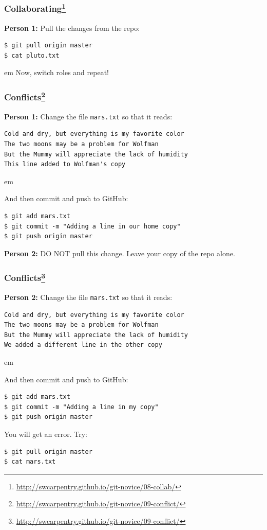 \documentclass{beamer}
\begin{document}
\begin{frame}[fragile]
\frametitle{Collaborating\footnote{\url{http://swcarpentry.github.io/git-novice/08-collab/}}}

\textbf{Person 1:} Pull the changes from the repo:
\begin{verbatim}
$ git pull origin master
$ cat pluto.txt
\end{verbatim}

\pause
{} em
Now, switch roles and repeat!

\end{frame}

\begin{frame}[fragile]
\frametitle{Conflicts\footnote{\url{http://swcarpentry.github.io/git-novice/09-conflict/}}}

\textbf{Person 1:} Change the file \texttt{mars.txt} so that it reads:
\begin{verbatim}
Cold and dry, but everything is my favorite color
The two moons may be a problem for Wolfman
But the Mummy will appreciate the lack of humidity
This line added to Wolfman's copy
\end{verbatim}

 em

And then commit and push to GitHub:
\begin{verbatim}
$ git add mars.txt
$ git commit -m "Adding a line in our home copy"
$ git push origin master
\end{verbatim}

\textbf{Person 2:} DO NOT pull this change. Leave your copy of the repo alone.

\end{frame}

\begin{frame}[fragile]
\frametitle{Conflicts\footnote{\url{http://swcarpentry.github.io/git-novice/09-conflict/}}}

\textbf{Person 2:} Change the file \texttt{mars.txt} so that it reads:
\begin{verbatim}
Cold and dry, but everything is my favorite color
The two moons may be a problem for Wolfman
But the Mummy will appreciate the lack of humidity
We added a different line in the other copy
\end{verbatim}

 em

And then commit and push to GitHub:
\begin{verbatim}
$ git add mars.txt
$ git commit -m "Adding a line in my copy"
$ git push origin master
\end{verbatim}

You will get an error. \pause Try:
\begin{verbatim}
$ git pull origin master
$ cat mars.txt
\end{verbatim}

\end{frame}
\end{document}
